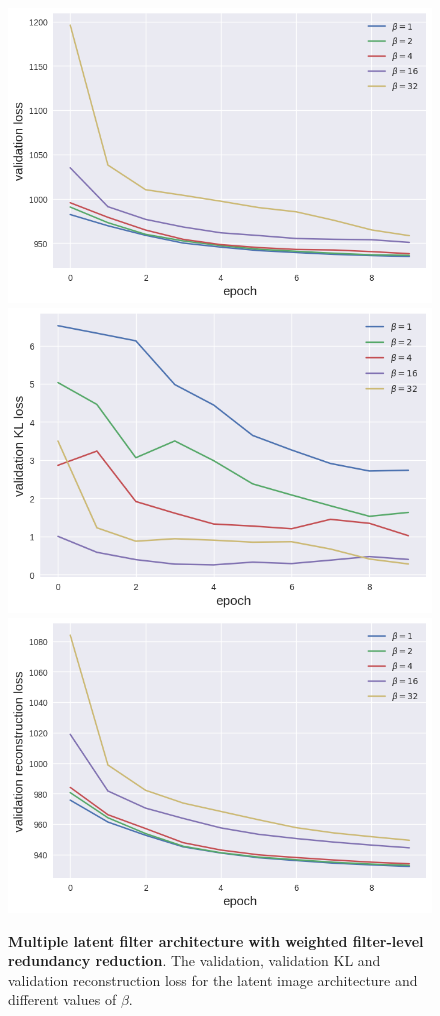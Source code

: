 \begin{figure}[h!]
\centering
\captionsetup{justification=centering}
    \includegraphics[scale=0.5]{figures/results/weighted_average/val_loss.png}
    \includegraphics[scale=0.5]{figures/results/weighted_average/val_kl_loss.png}
    \includegraphics[scale=0.5]{figures/results/weighted_average/val_reconstruction_loss.png}
\caption{\textbf{Multiple latent filter architecture with weighted filter-level redundancy reduction}. The validation, validation KL and validation reconstruction loss for the latent image architecture and different values of $\beta$.}
\label{fig:weighted_average_graphs}
\end{figure}
